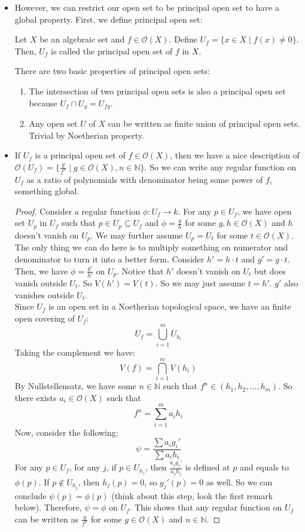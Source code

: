 \documentclass[15pt]{scrartcl}
\newcommand{\cO}{\mathcal{O}}
\begin{document}
\begin{itemize}
    \subsection{Regular function on principal open set}
    \item However, we can restrict our open set to be principal open set to have a global property. First, we define principal open set:
    \begin{definition}
        Let $X$ be an algebraic set and $f\in \mathcal{O}(X)$. Define $U_f=\{x\in X\mid f(x)\neq 0\}$. Then, $U_f$ is called the principal open set of $f$ in $X$.
    \end{definition}

    There are two basic properties of principal open sets:
    \begin{enumerate}
        \item The intersection of two principal open sets is also a principal open set because $U_f\cap U_g=U_{fg}$.
        \item Any open set $U$ of $X$ can be written as finite union of principal open sets. Trivial by Noetherian property.
    \end{enumerate}
    \item If $U_f$ is a principal open set of $f\in \cO(X)$, then we have a nice description of $\mathcal{O}(U_f)=\{\frac{g}{f^n}\mid g\in \mathcal{O}(X), n\in \mathbb{N}\}$. So we can write any regular function on $U_f$ as a ratio of polynomials with denominator being some power of $f$, something global.
    \begin{proof}
    Consider a regular function $\phi: U_f\to k$. For any $p\in U_f$, we have open set $U_p$ in $U_f$ such that $p\in U_p\subseteq U_f$ and $\phi=\frac{g}{h}$ for some $g, h\in \cO(X)$ and $h$ doesn't vanish on $U_p$. We may further assume $U_p=U_t$ for some $t\in \cO(X)$. The only thing we can do here is to multiply something on numerator and denominator to turn it into a better form. Consider $h'=h\cdot t$ and $g'=g\cdot t$. Then, we have $\phi=\frac{g'}{h'}$ on $U_p$. Notice that $h'$ doesn't vanish on $U_t$ but does vanish outside $U_t$. So $V(h')=V(t)$. So we may just assume $t=h'$. $g'$ also vanishes outside $U_t$. 
    \\

    Since $U_f$ is an open set in a Noetherian topological space, we have an finite open covering of $U_f$:
    \[U_f=\bigcup_{i=1}^m U_{h_i}\]
    Taking the complement we have: 
    \[V(f)=\bigcap_{i=1}^m V(h_i)\]
    By Nullstellensatz, we have some $n\in \mathbb{N}$ such that $f^n\in (h_1,h_2,\ldots,h_m)$. So there exists $a_i\in \cO(X)$ such that
    \[f^n=\sum_{i=1}^m a_i h_i\] 
    Now, consider the following: 
    \[\psi=\frac{\sum a_ig_i'}{\sum a_i h_i}\] 
    For any $p\in U_f$, for any $j$, if $p\in U_{h_j}$, then $\frac{a_jg_j'}{a_j h_j}$ is defined at $p$ and equals to $\phi(p)$. If $p\notin U_{h_j}$, then $h_j(p)=0$, so $g_j'(p)=0$ as well. So we can conclude $\psi(p)=\phi(p)$ (think about this step, look the first remark below). Therefore, $\psi=\phi$ on $U_f$. This shows that any regular function on $U_f$ can be written as $\frac{g}{f^n}$ for some $g\in \cO(X)$ and $n\in \mathbb{N}$. 
        

\end{proof}
\end{itemize}
\end{document}

